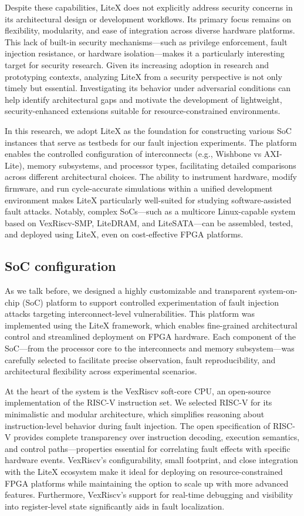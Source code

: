 Despite these capabilities, LiteX does not explicitly address security concerns in its architectural design or development workflows. Its primary focus remains on flexibility, modularity, and ease of integration across diverse hardware platforms. This lack of built-in security mechanisms—such as privilege enforcement, fault injection resistance, or hardware isolation—makes it a particularly interesting target for security research. Given its increasing adoption in research and prototyping contexts, analyzing LiteX from a security perspective is not only timely but essential. Investigating its behavior under adversarial conditions can help identify architectural gaps and motivate the development of lightweight, security-enhanced extensions suitable for resource-constrained environments.

In this research, we adopt LiteX as the foundation for constructing various SoC instances that serve as testbeds for our fault injection experiments. The platform enables the controlled configuration of interconnects (e.g., Wishbone vs AXI-Lite), memory subsystems, and processor types, facilitating detailed comparisons across different architectural choices. The ability to instrument hardware, modify firmware, and run cycle-accurate simulations within a unified development environment makes LiteX particularly well-suited for studying software-assisted fault attacks. Notably, complex SoCs—such as a multicore Linux-capable system based on VexRiscv-SMP, LiteDRAM, and LiteSATA—can be assembled, tested, and deployed using LiteX, even on cost-effective FPGA platforms.

\subsection{SoC configuration}
As we talk before, we designed a highly customizable and transparent system-on-chip (SoC) platform to support controlled experimentation of fault injection attacks targeting interconnect-level vulnerabilities. This platform was implemented using the LiteX framework, which enables fine-grained architectural control and streamlined deployment on FPGA hardware. Each component of the SoC—from the processor core to the interconnects and memory subsystem—was carefully selected to facilitate precise observation, fault reproducibility, and architectural flexibility across experimental scenarios.

At the heart of the system is the VexRiscv soft-core CPU, an open-source implementation of the RISC-V instruction set. We selected RISC-V for its minimalistic and modular architecture, which simplifies reasoning about instruction-level behavior during fault injection. The open specification of RISC-V provides complete transparency over instruction decoding, execution semantics, and control paths—properties essential for correlating fault effects with specific hardware events. VexRiscv’s configurability, small footprint, and close integration with the LiteX ecosystem make it ideal for deploying on resource-constrained FPGA platforms while maintaining the option to scale up with more advanced features. Furthermore, VexRiscv’s support for real-time debugging and visibility into register-level state significantly aids in fault localization.

